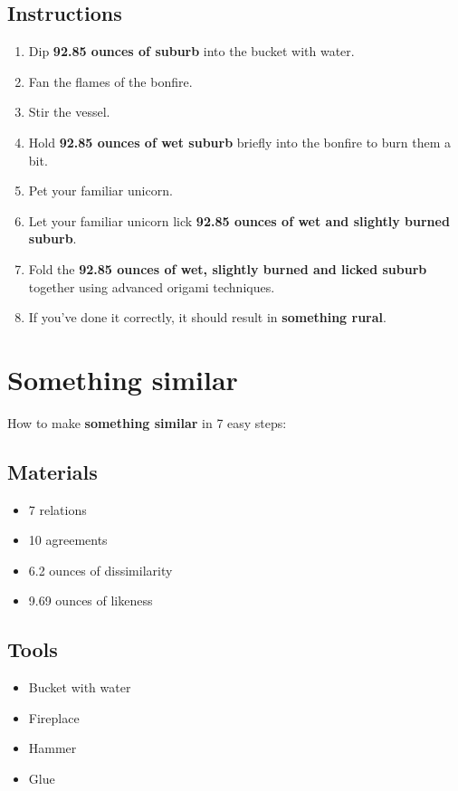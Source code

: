 \documentclass{article}
\begin{document}
\subsection{Instructions}\begin{enumerate}
\item 
Dip \textbf{92.85 ounces of suburb} into the bucket with water.
\item 
Fan the flames of the bonfire.
\item 
Stir the vessel.
\item 
Hold \textbf{92.85 ounces of wet suburb} briefly into the bonfire to burn them a bit.
\item 
Pet your familiar unicorn.
\item 
Let your familiar unicorn lick \textbf{92.85 ounces of wet and slightly burned suburb}.
\item 
Fold the \textbf{92.85 ounces of wet, slightly burned and licked suburb} together using advanced origami techniques.
\item 
If you've done it correctly, it should result in \textbf{something rural}.
\end{enumerate}
\newpage
\section{Something similar}How to make \textbf{something similar} in 7 easy steps:

\subsection{Materials}\begin{itemize}
\item 
7 relations
\item 
10 agreements
\item 
6.2 ounces of dissimilarity
\item 
9.69 ounces of likeness
\end{itemize}
\subsection{Tools}\begin{itemize}
\item 
Bucket with water
\item 
Fireplace
\item 
Hammer
\item 
Glue
\end{itemize}
\end{document}

